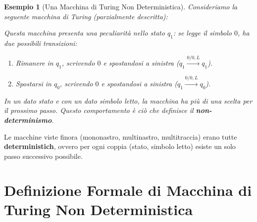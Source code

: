 \documentclass[a4paper]{article}
\newtheorem{example}{Esempio}
\begin{document}
\begin{example}[Una Macchina di Turing Non Deterministica]
Consideriamo la seguente macchina di Turing (parzialmente descritta):
\begin{center}
\end{center}
Questa macchina presenta una peculiarità nello stato $q_1$: se legge il simbolo $0$, ha due possibili transizioni:
\begin{enumerate}
    \item Rimanere in $q_1$, scrivendo $0$ e spostandosi a sinistra ($q_1 \xrightarrow{0/0, L} q_1$).
    \item Spostarsi in $q_0$, scrivendo $0$ e spostandosi a sinistra ($q_1 \xrightarrow{0/0, L} q_0$).
\end{enumerate}
In un dato stato e con un dato simbolo letto, la macchina ha più di una scelta per il prossimo passo. Questo comportamento è ciò che definisce il \textbf{non-determinismo}.
\end{example}

Le macchine viste finora (mononastro, multinastro, multitraccia) erano tutte \textbf{deterministich}, ovvero per ogni coppia (stato, simbolo letto) esiste un solo passo successivo possibile.

\section{Definizione Formale di Macchina di Turing Non Deterministica}
\end{document}
